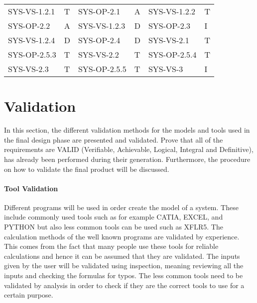 \begin{table}[htb]
\begin{tabular}{ll|ll|ll}
SYS-VS-1.2.1            &T                          &SYS-OP-2.1              &A                       &SYS-VS-1.2.2            &T          \\\hdashline
SYS-OP-2.2              &A                       &SYS-VS-1.2.3            &D &SYS-OP-2.3              &I  \\\hdashline     
SYS-VS-1.2.4            &D                       &SYS-OP-2.4              &D                       &SYS-VS-2.1              &T          \\\hdashline
SYS-OP-2.5.3            &T                       &SYS-VS-2.2              &T          &SYS-OP-2.5.4            &T         \\\hdashline              
SYS-VS-2.3              &T          &SYS-OP-2.5.5            &T                       &SYS-VS-3                &I    \\\bottomrule
\end{tabular}
\end{table}


\section{Validation}%

In this section, the different validation methods for the models and tools used in the  final design phase are presented and validated.
Prove that all of the requirements are VALID (Verifiable, Achievable, Logical, Integral and  Definitive), has already been performed during their generation. Furthermore, the procedure on how to validate the final product will be discussed.

\paragraph{Tool Validation}
Different programs will be used in order create the model of a system. These include commonly used tools such as for example CATIA, EXCEL, and PYTHON but also less common tools can be used such as XFLR5. The calculation methods of the well known programs are validated by experience. This comes from the fact that many people use these tools for reliable calculations and hence it can be assumed that they are validated. The inputs given by the user will be validated using inspection, meaning reviewing all the inputs and checking the formulas for typos. The less common tools need to be validated by analysis in order to check if they are the correct tools to use for a certain purpose.

